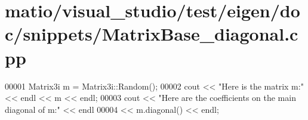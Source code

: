 \hypertarget{matio_2visual__studio_2test_2eigen_2doc_2snippets_2_matrix_base__diagonal_8cpp_source}{}\section{matio/visual\+\_\+studio/test/eigen/doc/snippets/\+Matrix\+Base\+\_\+diagonal.cpp}
\label{matio_2visual__studio_2test_2eigen_2doc_2snippets_2_matrix_base__diagonal_8cpp_source}

\begin{DoxyCode}
00001 Matrix3i m = Matrix3i::Random();
00002 cout << \textcolor{stringliteral}{"Here is the matrix m:"} << endl << m << endl;
00003 cout << \textcolor{stringliteral}{"Here are the coefficients on the main diagonal of m:"} << endl
00004      << m.diagonal() << endl;
\end{DoxyCode}
